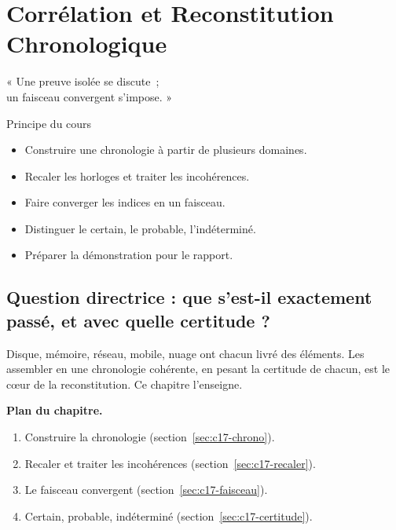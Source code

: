 
\chapter{Corrélation et Reconstitution Chronologique}
\label{chap:reconstitution}

\epigraph{%
    « Une preuve isolée se discute~;\\
    un faisceau convergent s'impose. »%
}{Principe du cours}


\begin{boxobjectifs}
\begin{itemize}
    \item Construire une chronologie à partir de plusieurs domaines.
    \item Recaler les horloges et traiter les incohérences.
    \item Faire converger les indices en un faisceau.
    \item Distinguer le certain, le probable, l'indéterminé.
    \item Préparer la démonstration pour le rapport.
\end{itemize}
\end{boxobjectifs}

\bigskip

\section*{Question directrice : que s'est-il exactement passé, et avec quelle certitude ?}

Disque, mémoire, réseau, mobile, nuage ont chacun livré des éléments. Les
assembler en une chronologie cohérente, en pesant la certitude de chacun, est
le cœur de la reconstitution. Ce chapitre l'enseigne.

\medskip
\textbf{Plan du chapitre.}
\begin{enumerate}
    \item Construire la chronologie (section~\ref{sec:c17-chrono}).
    \item Recaler et traiter les incohérences (section~\ref{sec:c17-recaler}).
    \item Le faisceau convergent (section~\ref{sec:c17-faisceau}).
    \item Certain, probable, indéterminé (section~\ref{sec:c17-certitude}).
\end{enumerate}

